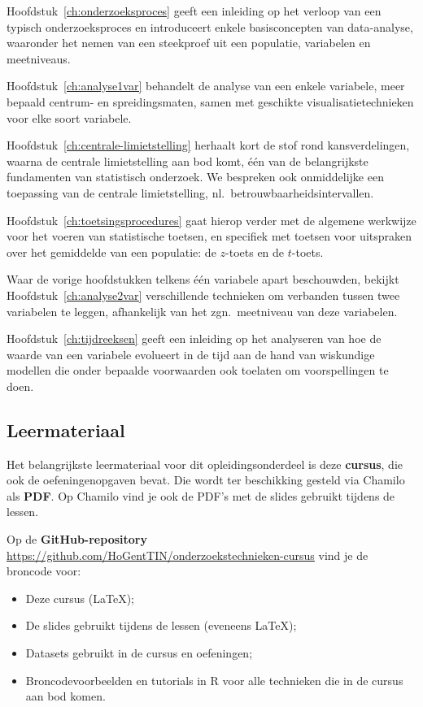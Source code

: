 Hoofdstuk~\ref{ch:onderzoeksproces} geeft een inleiding op het verloop van een typisch onderzoeksproces en introduceert enkele basisconcepten van data-analyse, waaronder het nemen van een steekproef uit een populatie, variabelen en meetniveaus.

Hoofdstuk~\ref{ch:analyse1var} behandelt de analyse van een enkele variabele, meer bepaald centrum- en spreidingsmaten, samen met geschikte visualisatietechnieken voor elke soort variabele.

Hoofdstuk~\ref{ch:centrale-limietstelling} herhaalt kort de stof rond kansverdelingen, waarna de centrale limietstelling aan bod komt, één van de belangrijkste fundamenten van statistisch onderzoek. We bespreken ook  onmiddelijke een toepassing van de centrale limietstelling, nl.\ betrouwbaarheidsintervallen.

Hoofdstuk~\ref{ch:toetsingsprocedures} gaat hierop verder met de algemene werkwijze voor het voeren van statistische toetsen, en specifiek met toetsen voor uitspraken over het gemiddelde van een populatie: de $z$-toets en de $t$-toets.

Waar de vorige hoofdstukken telkens één variabele apart beschouwden, bekijkt Hoofdstuk~\ref{ch:analyse2var} verschillende technieken om verbanden tussen twee variabelen te leggen, afhankelijk van het zgn.\ meetniveau van deze variabelen.

Hoofdstuk~\ref{ch:tijdreeksen} geeft een inleiding op het analyseren van hoe de waarde van een variabele evolueert in de tijd aan de hand van wiskundige modellen die onder bepaalde voorwaarden ook toelaten om voorspellingen te doen.

\subsection{Leermateriaal}

Het belangrijkste leermateriaal voor dit opleidingsonderdeel is deze \textbf{cursus}, die ook de oefeningenopgaven bevat. Die wordt ter beschikking gesteld via Chamilo als \textbf{PDF}. Op Chamilo vind je ook de PDF's met de slides gebruikt tijdens de lessen.

Op de \textbf{GitHub-repository} \url{https://github.com/HoGentTIN/onderzoekstechnieken-cursus} vind je de broncode voor:

\begin{itemize}
  \item Deze cursus (\LaTeX);
  \item De slides gebruikt tijdens de lessen (eveneens \LaTeX);
  \item Datasets gebruikt in de cursus en oefeningen;
  \item Broncodevoorbeelden en tutorials in R voor alle technieken die in de cursus aan bod komen.
\end{itemize}

